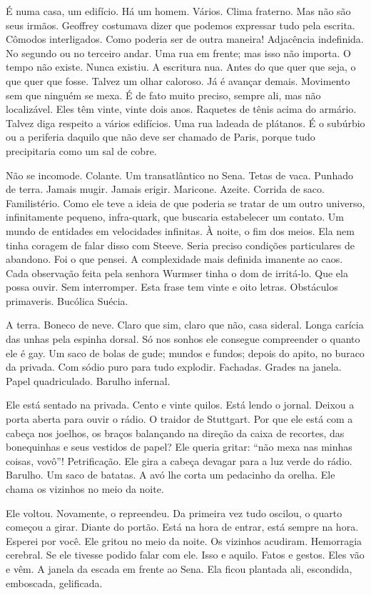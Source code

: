 É numa casa, um edifício. Há um homem. Vários. Clima fraterno. Mas não
são seus irmãos. Geoffrey costumava dizer que podemos expressar tudo
pela escrita. Cômodos interligados. Como poderia ser de outra maneira!
Adjacência indefinida. No segundo ou no terceiro andar. Uma rua em
frente; mas isso não importa. O tempo não existe. Nunca existiu. A
escritura nua. Antes do que quer que seja, o que quer que fosse. Talvez
um olhar caloroso. Já é avançar demais. Movimento sem que ninguém se
mexa. É de fato muito preciso, sempre ali, mas não localizável. Eles têm
vinte, vinte dois anos. Raquetes de tênis acima do armário. Talvez diga
respeito a vários edifícios. Uma rua ladeada de plátanos. É o subúrbio
ou a periferia daquilo que não deve ser chamado de Paris, porque tudo
precipitaria como um sal de cobre.

Não se incomode. Colante. Um transatlântico no Sena. Tetas de vaca.
Punhado de terra. Jamais mugir. Jamais erigir. Maricone. Azeite. Corrida
de saco. Familistério. Como ele teve a ideia de que poderia se tratar de
um outro universo, infinitamente pequeno, infra-quark, que buscaria
estabelecer um contato. Um mundo de entidades em velocidades infinitas.
À noite, o fim dos meios. Ela nem tinha coragem de falar disso com
Steeve. Seria preciso condições particulares de abandono. Foi o que
pensei. A complexidade mais definida imanente ao caos. Cada observação
feita pela senhora Wurmser tinha o dom de irritá-lo. Que ela possa
ouvir. Sem interromper. Esta frase tem vinte e oito letras. Obstáculos
primaveris. Bucólica Suécia.

A terra. Boneco de neve. Claro que sim, claro que não, casa sideral.
Longa carícia das unhas pela espinha dorsal. Só nos sonhos ele consegue
compreender o quanto ele é gay. Um saco de bolas de gude; mundos e
fundos; depois do apito, no buraco da privada. Com sódio puro para tudo
explodir. Fachadas. Grades na janela. Papel quadriculado. Barulho
infernal.

Ele está sentado na privada. Cento e vinte quilos. Está lendo o jornal.
Deixou a porta aberta para ouvir o rádio. O traidor de Stuttgart. Por
que ele está com a cabeça nos joelhos, os braços balançando na direção
da caixa de recortes, das bonequinhas e seus vestidos de papel? Ele
queria gritar: ``não mexa nas minhas coisas, vovô''! Petrificação. Ele
gira a cabeça devagar para a luz verde do rádio. Barulho. Um saco de
batatas. A avó lhe corta um pedacinho da orelha. Ele chama os vizinhos
no meio da noite.

Ele voltou. Novamente, o repreendeu. Da primeira vez tudo oscilou, o
quarto começou a girar. Diante do portão. Está na hora de entrar, está
sempre na hora. Esperei por você. Ele gritou no meio da noite. Os
vizinhos acudiram. Hemorragia cerebral. Se ele tivesse podido falar com
ele. Isso e aquilo. Fatos e gestos. Eles vão e vêm. A janela da escada
em frente ao Sena. Ela ficou plantada ali, escondida, emboscada,
gelificada.

